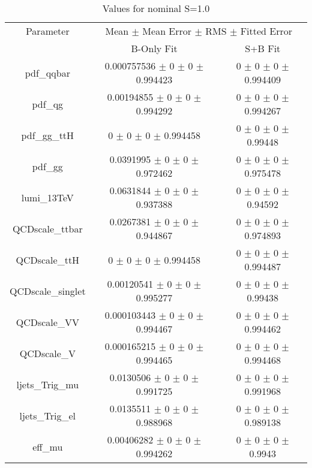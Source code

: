 \begin{table}
\centering
\caption{Values for nominal S=1.0}
\begin{tabular}{ccc}
\toprule
Parameter & \multicolumn{2}{c}{Mean $\pm$ Mean Error $\pm$ RMS $\pm$ Fitted Error}\\
 & B-Only Fit & S+B Fit\\
\midrule
pdf\_qqbar & \num{0.000757536} $\pm$ \num{0} $\pm$ \num{0} $\pm$ \num{0.994423} & \num{0} $\pm$ \num{0} $\pm$ \num{0} $\pm$ \num{0.994409}\\
pdf\_qg & \num{0.00194855} $\pm$ \num{0} $\pm$ \num{0} $\pm$ \num{0.994292} & \num{0} $\pm$ \num{0} $\pm$ \num{0} $\pm$ \num{0.994267}\\
pdf\_gg\_ttH & \num{0} $\pm$ \num{0} $\pm$ \num{0} $\pm$ \num{0.994458} & \num{0} $\pm$ \num{0} $\pm$ \num{0} $\pm$ \num{0.99448}\\
pdf\_gg & \num{0.0391995} $\pm$ \num{0} $\pm$ \num{0} $\pm$ \num{0.972462} & \num{0} $\pm$ \num{0} $\pm$ \num{0} $\pm$ \num{0.975478}\\
lumi\_13TeV & \num{0.0631844} $\pm$ \num{0} $\pm$ \num{0} $\pm$ \num{0.937388} & \num{0} $\pm$ \num{0} $\pm$ \num{0} $\pm$ \num{0.94592}\\
QCDscale\_ttbar & \num{0.0267381} $\pm$ \num{0} $\pm$ \num{0} $\pm$ \num{0.944867} & \num{0} $\pm$ \num{0} $\pm$ \num{0} $\pm$ \num{0.974893}\\
QCDscale\_ttH & \num{0} $\pm$ \num{0} $\pm$ \num{0} $\pm$ \num{0.994458} & \num{0} $\pm$ \num{0} $\pm$ \num{0} $\pm$ \num{0.994487}\\
QCDscale\_singlet & \num{0.00120541} $\pm$ \num{0} $\pm$ \num{0} $\pm$ \num{0.995277} & \num{0} $\pm$ \num{0} $\pm$ \num{0} $\pm$ \num{0.99438}\\
QCDscale\_VV & \num{0.000103443} $\pm$ \num{0} $\pm$ \num{0} $\pm$ \num{0.994467} & \num{0} $\pm$ \num{0} $\pm$ \num{0} $\pm$ \num{0.994462}\\
QCDscale\_V & \num{0.000165215} $\pm$ \num{0} $\pm$ \num{0} $\pm$ \num{0.994465} & \num{0} $\pm$ \num{0} $\pm$ \num{0} $\pm$ \num{0.994468}\\
ljets\_Trig\_mu & \num{0.0130506} $\pm$ \num{0} $\pm$ \num{0} $\pm$ \num{0.991725} & \num{0} $\pm$ \num{0} $\pm$ \num{0} $\pm$ \num{0.991968}\\
ljets\_Trig\_el & \num{0.0135511} $\pm$ \num{0} $\pm$ \num{0} $\pm$ \num{0.988968} & \num{0} $\pm$ \num{0} $\pm$ \num{0} $\pm$ \num{0.989138}\\
eff\_mu & \num{0.00406282} $\pm$ \num{0} $\pm$ \num{0} $\pm$ \num{0.994262} & \num{0} $\pm$ \num{0} $\pm$ \num{0} $\pm$ \num{0.9943}\\

\end{tabular}
\end{table}
